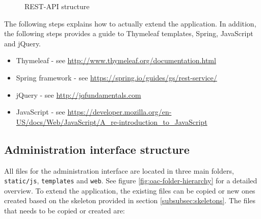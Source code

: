 \clearpage

\begin{center}
  \begin{figure}[ht!]
    \caption{REST-API structure}
    \label{fig:spring}
  \end{figure}
\end{center}

The following steps explains how to actually extend the application. In addition, the following steps provides a guide to Thymeleaf templates, Spring, JavaScript and jQuery. 

\begin{itemize}
\setlength{\itemsep}{0cm}%
\item Thymeleaf - see \url{http://www.thymeleaf.org/documentation.html}
\item Spring framework - see \url{https://spring.io/guides/gs/rest-service/}
\item jQuery - see \url{http://jqfundamentals.com}
\item JavaScript - see \url{https://developer.mozilla.org/en-US/docs/Web/JavaScript/A_re-introduction_to_JavaScript}
\end{itemize}

\subsection{Administration interface structure}

All files for the administration interface are located in three main folders, \verb!static/js!, \verb!templates! and \verb!web!. See figure \ref{fig:oac-folder-hierarchy} for a detailed overview. To extend the application, the existing files can be copied or new ones created based on the skeleton provided in section \ref{subsubsec:skeletons}. The files that needs to be copied or created are:

